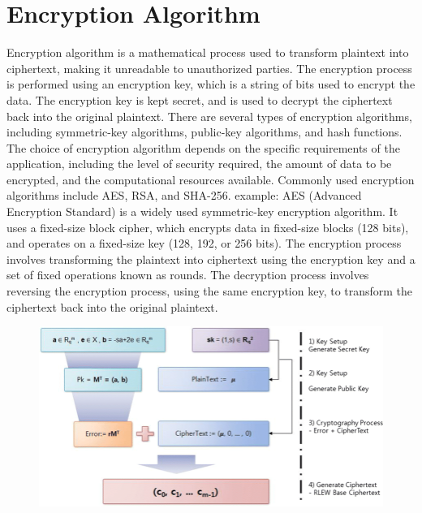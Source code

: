 \documentclass[a4paper,11pt]{report}
\begin{document}
\section{Encryption Algorithm}
Encryption algorithm is a mathematical process used to transform plaintext into ciphertext, making it unreadable to unauthorized parties. The encryption process is performed using an encryption key, which is a string of bits used to encrypt the data. The encryption key is kept secret, and is used to decrypt the ciphertext back into the original plaintext. There are several types of encryption algorithms, including symmetric-key algorithms, public-key algorithms, and hash functions. The choice of encryption algorithm depends on the specific requirements of the application, including the level of security required, the amount of data to be encrypted, and the computational resources available. Commonly used encryption algorithms include AES, RSA, and SHA-256.
example: AES (Advanced Encryption Standard) is a widely used symmetric-key encryption algorithm. It uses a fixed-size block cipher, which encrypts data in fixed-size blocks (128 bits), and operates on a fixed-size key (128, 192, or 256 bits). The encryption process involves transforming the plaintext into ciphertext using the encryption key and a set of fixed operations known as rounds. The decryption process involves reversing the encryption process, using the same encryption key, to transform the ciphertext back into the original plaintext.
 \begin{figure}[h]
	\centering
	\hspace{21pt}
	\includegraphics[width=.70\linewidth]{algo.png}
	\label{fig:type.png}
\end{figure}
\end{document}
